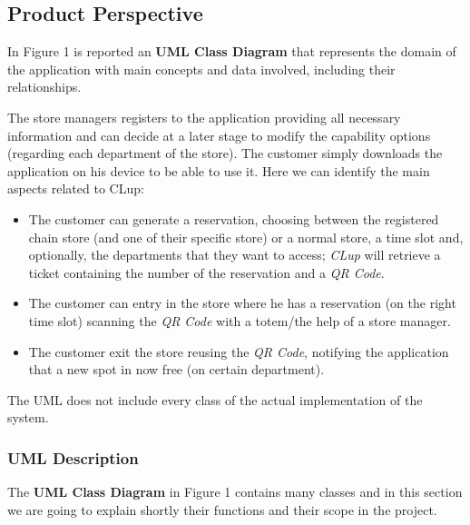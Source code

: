 \documentclass{article}
\begin{document}
	\subsection{Product Perspective}
	
	
	In Figure 1 is reported an {\bfseries UML Class Diagram} that represents the domain of the application with main concepts and data involved, including their relationships.
	
	The store managers registers to the application providing all necessary information and can decide at a later stage to modify the capability options (regarding each department of the store). The customer simply downloads the application on his device to be able to use it. Here we can identify the main aspects related to CLup:
	
	\begin{itemize}
		
		\item The customer can generate a reservation, choosing between the registered chain store (and one of their specific store) or a normal store, a time slot and, optionally, the departments that they want to access; \emph{CLup} will retrieve a ticket containing the number of the reservation and a \emph{QR Code}.
		
		\item The customer can entry in the store where he has a reservation (on the right time slot) scanning the \emph{QR Code} with a totem/the help of a store manager.
		
		\item The customer exit the store reusing the \emph{QR Code}, notifying the application that a new spot in now free (on certain department).
		
	\end{itemize}

	The UML does not include every class of the actual implementation of the system.
		
		\subsubsection{UML Description}
		
			The {\bfseries UML Class Diagram} in Figure 1 contains many classes and in this section we are going to explain shortly their functions and their scope in the project.
			
\end{document}
